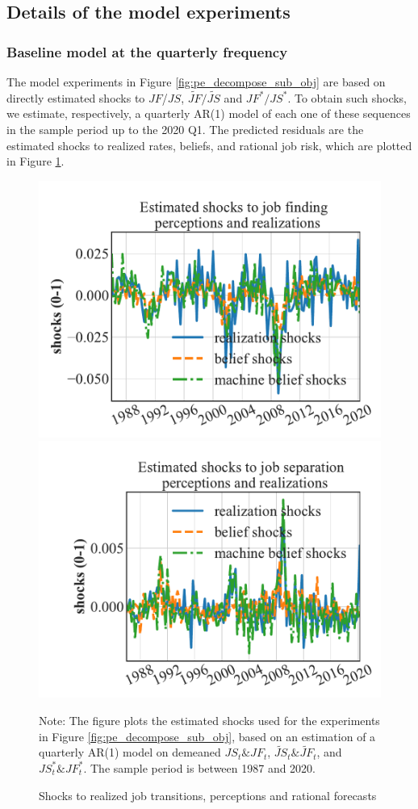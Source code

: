 \subsection{Details of the model experiments}

\subsubsection{Baseline model at the quarterly frequency}

The model experiments in Figure \ref{fig:pe_decompose_sub_obj} are based on directly estimated shocks to $JF$/$JS$, $\widetilde{JF}/\widetilde{JS}$ and ${JF}^*/{JS}^*$. To obtain such shocks, we estimate, respectively, a quarterly AR(1) model of each one of these sequences in the sample period up to the 2020 Q1. The predicted residuals are the estimated shocks to realized rates, beliefs, and rational job risk, which are plotted in Figure \ref{fig:shocks_from_data}. 

\begin{figure}[pt]
    \centering
    \caption{Shocks to realized job transitions, perceptions and rational forecasts}
    \label{fig:shocks_from_data} \includegraphics[width=0.45\linewidth]{Figures/estimated_shocks_job_finding.pdf}
    \includegraphics[width=0.45\linewidth]{Figures/estimated_shocks_job_separation.pdf}
\begin{flushleft}\footnotesize {Note: The figure plots the estimated shocks used for the experiments in Figure \ref{fig:pe_decompose_sub_obj}, based on an estimation of a quarterly AR(1) model on demeaned $JS_{t}\& JF_t$, $\widetilde{JS}_t \& \widetilde{JF}_t$, and $JS^{*}_t \& JF^{*}_t$. The sample period is between 1987 and 2020.} \end{flushleft}
\end{figure}


